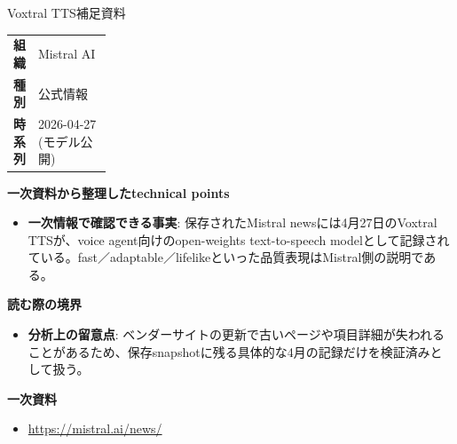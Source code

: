 \begin{technicalnote}{Voxtral TTS}{補足資料}
\begingroup
\begin{tabularx}{\linewidth}{@{}>{\bfseries}p{0.22\linewidth}X@{}}
組織 & Mistral AI \\
種別 & 公式情報 \\
時系列 & 2026-04-27 (モデル公開) \\
\end{tabularx}
\smallskip
{\bfseries 一次資料から整理したtechnical points}
\begin{itemize}[leftmargin=1.5em,itemsep=0.35em]
\item \textbf{一次情報で確認できる事実}: 保存されたMistral newsには4月27日のVoxtral TTSが、voice agent向けのopen-weights text-to-speech modelとして記録されている。fast／adaptable／lifelikeといった品質表現はMistral側の説明である。
\end{itemize}
\begin{minipage}{\linewidth}
{\bfseries 読む際の境界}
\begin{itemize}[leftmargin=1.5em,itemsep=0.35em]
\item \textbf{分析上の留意点}: ベンダーサイトの更新で古いページや項目詳細が失われることがあるため、保存snapshotに残る具体的な4月の記録だけを検証済みとして扱う。
\end{itemize}
\begin{samepage}
{\bfseries 一次資料}
\begingroup\sloppy
\begin{itemize}[leftmargin=1.5em,itemsep=0.25em]
\item {\scriptsize\url{https://mistral.ai/news/}}
\end{itemize}
\endgroup
\end{samepage}
\end{minipage}
\endgroup
\end{technicalnote}
\medskip

